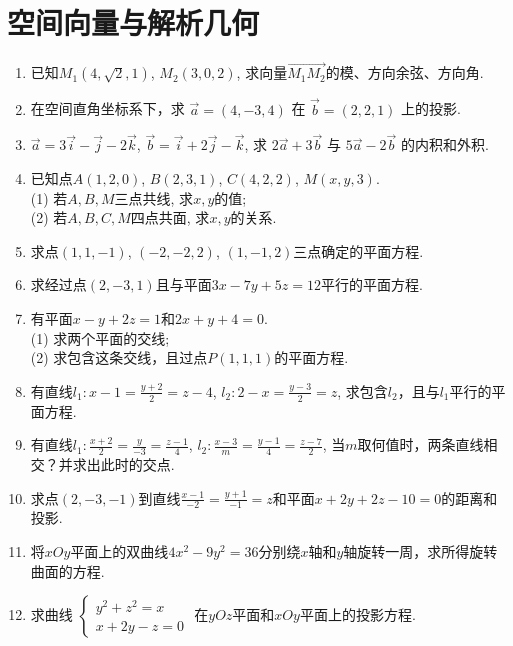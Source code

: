 \section{空间向量与解析几何}
\begin{enumerate}[itemsep=0.3em,topsep=0pt]
	
	\item 已知$M_1(4, \sqrt{2}, 1)$, $M_2(3,0,2)$, 求向量$\vec{M_1M_2}$的模、方向余弦、方向角.
	
	\item 在空间直角坐标系下，求 $\vec{a} = (4, -3, 4)$ 在 $\vec{b} = (2,2,1)$ 上的投影.

	\item $\vec{a} = 3\vec{i} - \vec{j} - 2\vec{k}$, $\vec{b} = \vec{i} + 2\vec{j} - \vec{k}$, 求 $2\vec{a} + 3\vec{b}$ 与 $5\vec{a} - 2\vec{b}$ 的内积和外积.

	\item 已知点$A(1,2,0)$, $B(2,3,1)$, $C(4,2,2)$, $M(x,y,3)$.\\
	(1) 若$A,B,M$三点共线, 求$x,y$的值;\\
	(2) 若$A,B,C,M$四点共面, 求$x,y$的关系.
	
	
	\item 求点$(1,1,-1)$, $(-2,-2,2)$, $(1,-1,2)$三点确定的平面方程.

	\item 求经过点$(2, -3, 1)$且与平面$3x - 7y + 5z = 12$平行的平面方程.

	\item 有平面$x - y + 2z = 1$和$2x + y + 4 = 0$.\\
	(1) 求两个平面的交线; \\ (2) 求包含这条交线，且过点$P(1,1,1)$的平面方程.

	\item 有直线$l_1: x-1=\frac{y+2}{2}=z-4$, $l_2: 2-x=\frac{y-3}{2}=z$, 求包含$l_2$，且与$l_1$平行的平面方程.

	
	\item 有直线$l_1: \frac{x+2}{2}=\frac{y}{-3}=\frac{z-1}{4}$, $l_2: \frac{x-3}{m}=\frac{y-1}{4}=\frac{z-7}{2}$, 当$m$取何值时，两条直线相交？并求出此时的交点.
	
	\item 求点$(2, -3, -1)$到直线$\frac{x-1}{-2}=\frac{y+1}{-1}=z$和平面$x+2y+2z-10=0$的距离和投影.

	\item 将$xOy$平面上的双曲线$4x^2 - 9y^2 = 36$分别绕$x$轴和$y$轴旋转一周，求所得旋转曲面的方程.

	\item 求曲线 $\begin{cases} y^2+z^2 = x \\ x+2y-z=0 \end{cases}$ 在$yOz$平面和$xOy$平面上的投影方程.
	
\end{enumerate}

